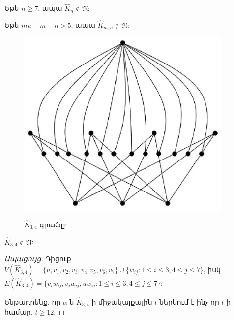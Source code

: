 \begin{hide}
\begin{corollary}
\label{c3_subdivision_complete} Եթե $n\geq 7$, ապա $\widehat{K}_{n}\notin
\mathfrak{N}$:
\end{corollary}
\begin{corollary}
\label{c3_subdivision_complete_bipartite} Եթե $mn-m-n>5$, ապա $\widehat{K}_{m,n}\notin \mathfrak{N}$:
\end{corollary}

\begin{figure}[h]
\begin{center}
\includegraphics[width=25pc]{figures/subdivisionK34.eps}\\
\caption{$\widehat{K}_{3,4}$ գրաֆը:}\label{f3_subdivisionK34}
\end{center}
\end{figure}


\begin{theorem}
\label{t3_subdivision_K34} $\widehat{K}_{3,4}\notin \mathfrak{N}$:
\end{theorem}
\begin{proof}[Ապացույց]
Դիցուք
$V(\widehat{K}_{3,4})=\{u,v_{1},v_{2},v_{3},v_{4},v_{5},v_{6},v_{7}\}\cup
\{w_{ij}:1\leq i\leq 3, 4\leq j\leq 7\}$, իսկ
$E(\widehat{K}_{3,4})=\{v_{i}w_{ij},v_{j}w_{ij},uw_{ij}:1\leq i\leq
3, 4\leq j\leq 7\}$:

Ենթադրենք, որ $\alpha$-ն $\widehat{K}_{3,4}$-ի միջակայքային $t$-ներկում է ինչ որ $t$-ի համար, $t\geq 12$:


\end{proof}
\end{hide}
